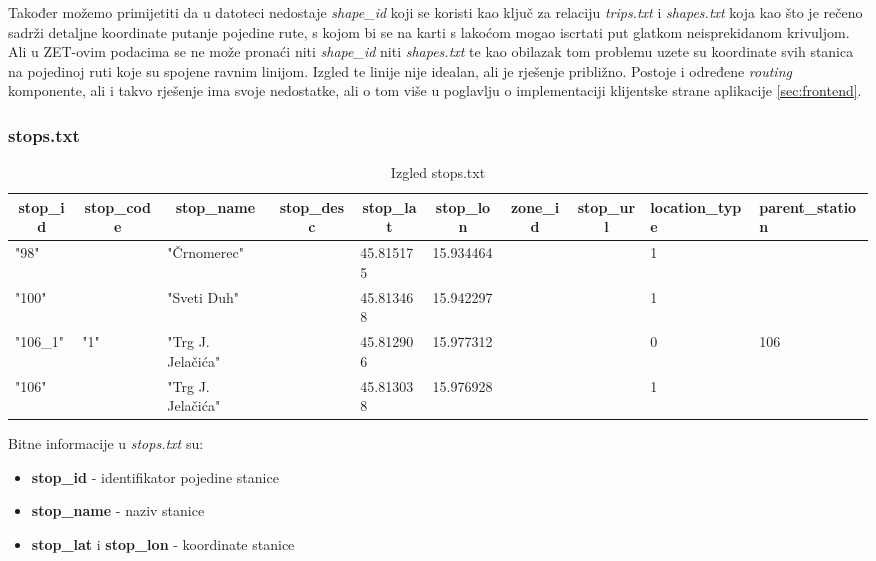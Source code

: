 \documentclass[zavrsnirad]{fer}
\begin{document}
Također možemo primijetiti da u datoteci nedostaje \textit{shape\_id} koji se koristi kao ključ za relaciju \textit{trips.txt} i \textit{shapes.txt} koja kao što je rečeno sadrži detaljne koordinate putanje pojedine rute, s kojom bi se na karti s lakoćom mogao iscrtati put glatkom neisprekidanom krivuljom.
Ali u ZET-ovim podacima se ne može pronaći niti \textit{shape\_id} niti \textit{shapes.txt} te kao obilazak tom problemu uzete su koordinate svih stanica na pojedinoj ruti koje su spojene ravnim linijom. Izgled te linije nije idealan, ali je rješenje približno. Postoje i određene \textit{routing} komponente, ali i takvo rješenje ima svoje nedostatke, ali o tom više u poglavlju o implementaciji klijentske strane aplikacije \ref{sec:frontend}.
\newpage
\subsubsection{stops.txt}

\begin{table}[htb]
	\begin{adjustbox}{width=\columnwidth,center}
	\begin{tabular}{l|l|l|l|l|l|l|l|l|l}
		\hline
		\multicolumn{1}{c|}{\textbf{stop\_id}} & \multicolumn{1}{c|}{\textbf{stop\_code}} & \multicolumn{1}{c|}{\textbf{stop\_name}} & \multicolumn{1}{c|}{\textbf{stop\_desc}} & \multicolumn{1}{c|}{\textbf{stop\_lat}} & \multicolumn{1}{c|}{\textbf{stop\_lon}} & \multicolumn{1}{c|}{\textbf{zone\_id}} & \multicolumn{1}{c|}{\textbf{stop\_url}} & \textbf{location\_type} & \textbf{parent\_station} \\ \hline
		"98" &  & "Črnomerec" &  & 45.815175 & 15.934464 &  &  & 1 &  \\ \hline
		"100" &  & "Sveti Duh" &  & 45.813468 & 15.942297 &  &  & 1 &  \\ \hline
		"106\_1" & "1" & "Trg J. Jelačića" &  & 45.812906 & 15.977312 &  &  & 0 & 106 \\ \hline
		"106" &  & "Trg J. Jelačića" &  & 45.813038 & 15.976928 &  &  & 1 &  \\ \hline
	\end{tabular}
	\end{adjustbox}
	\caption{Izgled stops.txt}
	\label{tbl:stops}
\end{table}

Bitne informacije u \textit{stops.txt} su:
\begin{itemize}
	\item \textbf{stop\_id} - identifikator pojedine stanice
	\item \textbf{stop\_name} - naziv stanice
	\item \textbf{stop\_lat} i \textbf{stop\_lon} - koordinate stanice
\end{itemize}
\end{document}
